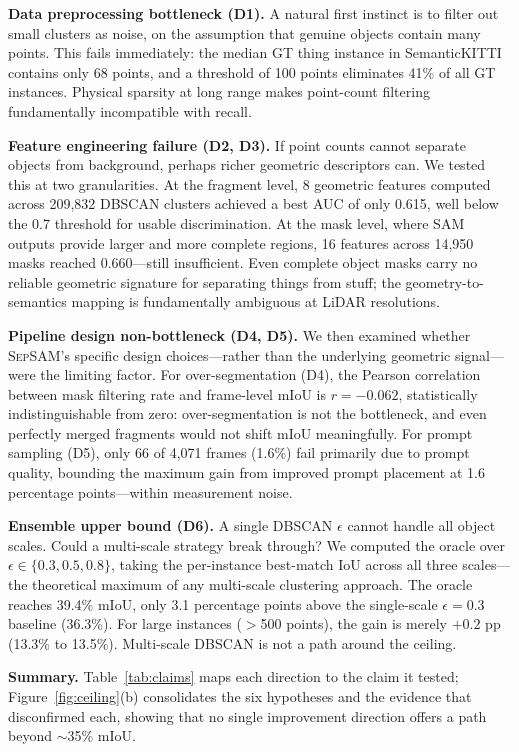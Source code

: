 \documentclass{article}
\begin{document}
\textbf{Data preprocessing bottleneck (D1).} A natural first instinct is to filter out
small clusters as noise, on the assumption that genuine objects contain many points.
This fails immediately: the median GT thing instance in SemanticKITTI contains only 68
points, and a threshold of 100 points eliminates 41\% of all GT instances. Physical
sparsity at long range makes point-count filtering fundamentally incompatible with
recall.

\textbf{Feature engineering failure (D2, D3).} If point counts cannot separate objects
from background, perhaps richer geometric descriptors can. We tested this at two
granularities. At the fragment level, 8 geometric features computed across 209,832
DBSCAN clusters achieved a best AUC of only 0.615, well below the 0.7 threshold for
usable discrimination. At the mask level, where SAM outputs provide larger and more
complete regions, 16 features across 14,950 masks reached 0.660---still insufficient.
Even complete object masks carry no reliable geometric signature for separating things
from stuff; the geometry-to-semantics mapping is fundamentally ambiguous at LiDAR
resolutions.

\textbf{Pipeline design non-bottleneck (D4, D5).} We then examined whether
\textsc{SepSAM}'s specific design choices---rather than the underlying geometric
signal---were the limiting factor. For over-segmentation (D4), the Pearson correlation
between mask filtering rate and frame-level mIoU is $r = -0.062$, statistically
indistinguishable from zero: over-segmentation is not the bottleneck, and even
perfectly merged fragments would not shift mIoU meaningfully. For prompt sampling
(D5), only 66 of 4,071 frames (1.6\%) fail primarily due to prompt quality, bounding
the maximum gain from improved prompt placement at 1.6 percentage points---within
measurement noise.

\textbf{Ensemble upper bound (D6).} A single DBSCAN $\epsilon$ cannot handle all object
scales. Could a multi-scale strategy break through? We computed the oracle over
$\epsilon \in \{0.3, 0.5, 0.8\}$, taking the per-instance best-match IoU across all
three scales---the theoretical maximum of any multi-scale clustering approach. The
oracle reaches 39.4\% mIoU, only 3.1 percentage points above the single-scale
$\epsilon=0.3$ baseline (36.3\%). For large instances ($>$500 points), the gain is
merely $+0.2$ pp (13.3\% to 13.5\%). Multi-scale DBSCAN is not a path around the
ceiling.

\textbf{Summary.} Table~\ref{tab:claims} maps each direction to the claim it tested;
Figure~\ref{fig:ceiling}(b) consolidates the six hypotheses and the evidence that
disconfirmed each, showing that no single improvement direction offers a path beyond
$\sim$35\% mIoU.
\end{document}

